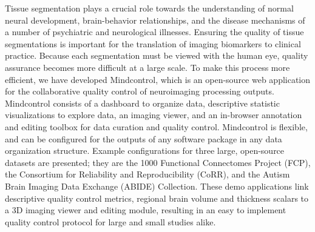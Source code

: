 Tissue segmentation plays a crucial role towards the understanding of normal neural development, brain-behavior relationships, and the disease mechanisms of a number of psychiatric and neurological illnesses. Ensuring the quality of tissue segmentations is important for the translation of imaging biomarkers to clinical practice. Because each segmentation must be viewed with the human eye, quality assurance becomes more difficult at a large scale. To make this process more efficient, we have developed Mindcontrol, which is an open-source web application for the collaborative quality control of neuroimaging processing outputs. Mindcontrol consists of a dashboard to organize data, descriptive statistic visualizations to explore data, an imaging viewer, and an in-browser annotation and editing toolbox for data curation and quality control. Mindcontrol is flexible, and can be configured for the outputs of any software package in any data organization structure. Example configurations for three large, open-source datasets are presented; they are the 1000 Functional Connectomes Project (FCP), the Consortium for Reliability and Reproducibility (CoRR), and the Autism Brain Imaging Data Exchange (ABIDE) Collection. These demo applications link descriptive quality control metrics, regional brain volume and thickness scalars to a 3D imaging viewer and editing module, resulting in an easy to implement quality control protocol for large and small studies alike.